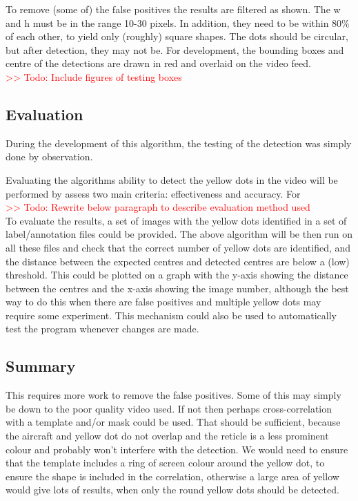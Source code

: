 \documentclass[final]{cmpreport_02}
\begin{document}
To remove (some of) the false positives the results are filtered as shown. The w and h must be in the range 10-30 pixels. In addition, they need to be within 80\% of each other, to yield only (roughly) square shapes. The dots should be circular, but after detection, they may not be. For development, the bounding boxes and centre of the detections are drawn in red and overlaid on the video feed.\\
\textcolor{red}{>> Todo: Include figures of testing boxes}

\subsection{Evaluation}

During the development of this algorithm, the testing of the detection was simply done by observation. 

Evaluating the algorithms ability to detect the yellow dots in the video will be performed by assess two main criteria: effectiveness and accuracy. For 
\\
\textcolor{red}{>> Todo: Rewrite below paragraph to describe evaluation method used}\\

To evaluate the results, a set of images with the yellow dots identified in a set of label/annotation files could be provided. The above algorithm will be then run on all these files and check that the correct number of yellow dots are identified, and the distance between the expected centres and detected centres are below a (low) threshold. This could be plotted on a graph with the y-axis showing the distance between the centres and the x-axis showing the image number, although the best way to do this when there are false positives and multiple yellow dots may require some experiment. This mechanism could also be used to automatically test the program whenever changes are made.


\subsection{Summary}

This requires more work to remove the false positives. Some of this may simply be down to the poor quality video used. If not then perhaps cross-correlation with a template and/or mask could be used. That should be sufficient, because the aircraft and yellow dot do not overlap and the reticle is a less prominent colour and probably won't interfere with the detection. We would need to ensure that the template includes a ring of screen colour around the yellow dot, to ensure the shape is included in the correlation, otherwise a large area of yellow would give lots of results, when only the round yellow dots should be detected.
\end{document}
